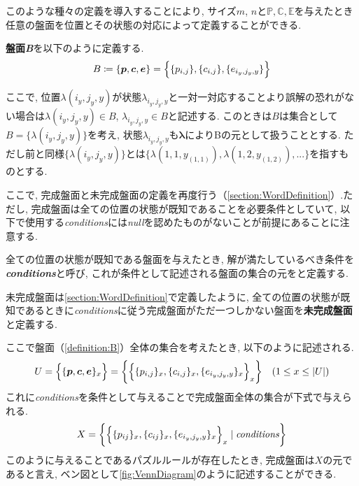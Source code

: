 このような種々の定義を導入することにより, サイズ$m$, $n$と$\mathbb{P},\mathbb{C},\mathbb{E}$を与えたとき任意の盤面を位置とその状態の対応によって定義することができる.
\begin{definition}[盤面\textit{B}]\label{definition:B}
  \textbf{盤面\textit{B}}を以下のように定義する.
  \begin{equation*}
    B\coloneqq \{\bm{p},\bm{c},\bm{e}\}=\Bigl\{\{p_{i,j}\},\{c_{i,j}\},\{e_{i_y,j_y,y}\}\Bigr\}
  \end{equation*}
\end{definition}
ここで, 位置$\lambda(i_y,j_y,y)$が状態$\lambda_{i_y,j_y,y}$と一対一対応することより誤解の恐れがない場合は$\lambda(i_y,j_y,y) \in B  $,  $\lambda_{i_y,j_y,y}\in B $と記述する.
このときは$B$は集合として$B=\{\lambda(i_y,j_y,y)\}$を考え, 状態$\lambda_{i_y,j_y,y}$も$\bm{\lambda}$によりBの元として扱うこととする.
ただし前と同様$\{\lambda(i_y,j_y,y)\}$とは$\{\lambda(1,1,y_{(1,1)}), \lambda(1,2,y_{(1,2)}),...\}$を指すものとする.

ここで, 完成盤面と未完成盤面の定義を再度行う（\cref{section:WordDefinition}）.ただし, 完成盤面は全ての位置の状態が既知であることを必要条件としていて, 以下で使用する\textit{conditions}には\textit{null}を認めたものがないことが前提にあることに注意する.
\begin{definition}\label{definition:Conditions}
  全ての位置の状態が既知である盤面を与えたとき, 解が満たしているべき条件を\textbf{\textit{conditions}}と呼び, これが条件として記述される盤面の集合の元をと定義する.
\end{definition}

未完成盤面は\cref{section:WordDefinition}で定義したように, 全ての位置の状態が既知であるときに\textit{conditions}に従う完成盤面がただ一つしかない盤面を\textbf{未完成盤面}と定義する.

ここで盤面（\cref{definition:B}）全体の集合を考えたとき, 以下のように記述される.
\begin{equation}\label{equation:U}
  U=\Bigl\{\{\bm{p},\bm{c},\bm{e}\}_x\Bigr\}=\biggl\{\Bigl\{\{p_{i,j}\}_x,\{c_{i,j}\}_x,\{e_{i_y,j_y,y}\}_x\Bigr\}_x\biggr\} \quad (1\leq x \leq |U|)
\end{equation}
これに\textit{conditions}を条件として与えることで完成盤面全体の集合が下式で与えられる.
\begin{equation}\label{equation:X}
  X=\biggl\{\Bigl\{\{p_{ij}\}_x,\{c_{ij}\}_x,\{e_{i_y,j_y,y}\}_x\Bigr\}_x\mid \rm{\textit{conditions}}\biggr\}
\end{equation}
このように与えることであるパズルルールが存在したとき, 完成盤面は$X$の元であると言え, ベン図として\cref{fig:VennDiagram}のように記述することができる.

